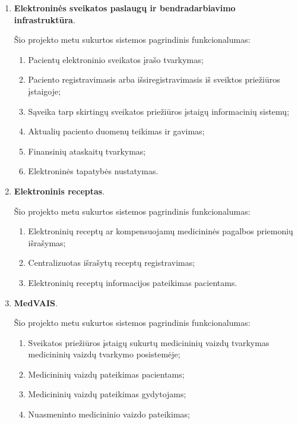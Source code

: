 \begin{enumerate}
    \item \textbf{Elektroninės sveikatos paslaugų ir bendradarbiavimo infrastruktūra}.
    
    Šio projekto metu sukurtos sistemos pagrindinis funkcionalumas:
    \begin{enumerate}
        \item Pacientų elektroninio sveikatos įrašo tvarkymas;
        \item Paciento registravimasis arba išsiregistravimasis iš sveiktos priežiūros įstaigoje;
        \item Sąveika tarp skirtingų sveikatos priežiūros įstaigų informacinių sistemų;
        \item Aktualių paciento duomenų teikimas ir gavimas;
        \item Finansinių ataskaitų tvarkymas;
        \item Elektroninės tapatybės nustatymas.
    \end{enumerate}
    \item \textbf{Elektroninis receptas}. 
    
    Šio projekto metu sukurtos sistemos pagrindinis funkcionalumas:
    \begin{enumerate}
        \item Elektroninių receptų ar kompensuojamų medicininės pagalbos priemonių išrašymas;
        \item Centralizuotas išrašytų receptų registravimas;
        \item Elektroninių receptų informacijos pateikimas pacientams.
    \end{enumerate}

    \item \textbf{MedVAIS}.
    
    Šio projekto metu sukurtos sistemos pagrindinis funkcionalumas:
    \begin{enumerate}
        \item Sveikatos priežiūros įstaigų sukurtų medicininių vaizdų tvarkymas medicininių vaizdų tvarkymo posistemėje;
        \item Medicininių vaizdų pateikimas pacientams;
        \item Medicininių vaizdų pateikimas gydytojams;
        \item Nuasmeninto medicininio vaizdo pateikimas;
    \end{enumerate}
\end{enumerate}


